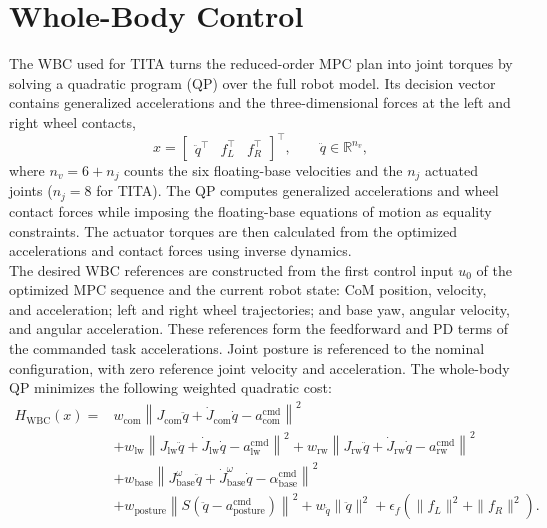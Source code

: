 \section{Whole-Body Control}
\label{subsec:wbc_dfcip}
The WBC used for TITA turns the reduced-order MPC plan into joint torques by
solving a quadratic program (QP) over the full robot model. Its decision vector
contains generalized accelerations and the three-dimensional forces at the
left and right wheel contacts,
\[
    x = \begin{bmatrix}
        \ddot{q}^{\top} & f_L^{\top} & f_R^{\top}
    \end{bmatrix}^{\top},
    \qquad \ddot{q}\in\mathbb{R}^{n_v},
\]
where $n_v=6+n_j$ counts the six floating-base velocities and the $n_j$
actuated joints ($n_j=8$ for TITA).
The QP computes generalized accelerations and wheel contact forces while
imposing the floating-base equations of motion as equality constraints. The
actuator torques are then calculated from the optimized accelerations and
contact forces using inverse dynamics.\\
The desired WBC references are constructed from the first control input
$u_0$ of the optimized MPC sequence and the current robot state:
CoM position, velocity, and acceleration; left and right wheel trajectories;
and base yaw, angular velocity, and angular acceleration. These references
form the feedforward and PD terms of the commanded task accelerations. Joint
posture is referenced to the nominal configuration, with zero reference joint
velocity and acceleration. The whole-body QP minimizes the following weighted
quadratic cost:
\begin{equation}
\begin{aligned}
H_{\mathrm{WBC}}(x) ={}&
    w_{\mathrm{com}}
    \left\|J_{\mathrm{com}}\ddot{q}
        +\dot{J}_{\mathrm{com}}\dot{q}
        -a_{\mathrm{com}}^{\mathrm{cmd}}\right\|^2
    \\
    &+w_{\mathrm{lw}}
    \left\|J_{\mathrm{lw}}\ddot{q}
        +\dot{J}_{\mathrm{lw}}\dot{q}
        -a_{\mathrm{lw}}^{\mathrm{cmd}}\right\|^2
    +w_{\mathrm{rw}}
    \left\|J_{\mathrm{rw}}\ddot{q}
        +\dot{J}_{\mathrm{rw}}\dot{q}
        -a_{\mathrm{rw}}^{\mathrm{cmd}}\right\|^2
    \\
    &+w_{\mathrm{base}}
    \left\|J_{\mathrm{base}}^{\omega}\ddot{q}
        +\dot{J}_{\mathrm{base}}^{\omega}\dot{q}
        -\alpha_{\mathrm{base}}^{\mathrm{cmd}}\right\|^2
    \\
    &+w_{\mathrm{posture}}
    \left\|S\left(\ddot{q}
    -a_{\mathrm{posture}}^{\mathrm{cmd}}\right)\right\|^2
    +w_{\ddot{q}}\|\ddot{q}\|^2
    +\epsilon_f
        \left(\|f_L\|^2+\|f_R\|^2\right).
\end{aligned}
\label{eq:tita_wbc_cost}
\end{equation}
